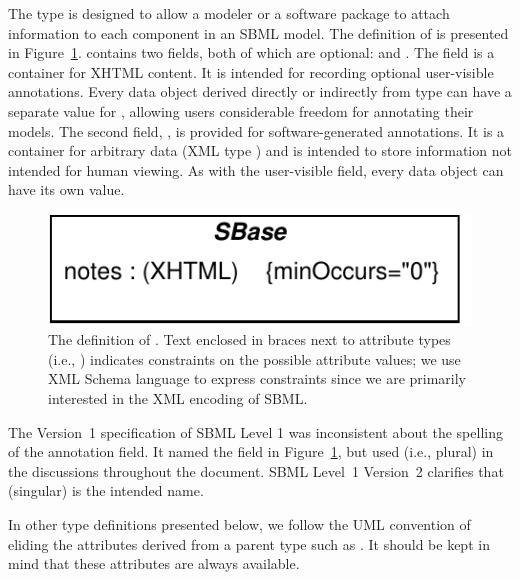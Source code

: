 \documentclass[10pt]{cekarticle}
\newcommand{\vref}[1]{\ref{#1}}
\newcommand{\changed}[1]{\textcolor{BrickRed}{#1}}
\begin{document}
The type  is designed to allow a modeler or a software package
to attach information to each component in an SBML model.  The definition
of  is presented in Figure~\vref{fig:identified}.
 contains two fields, both of which are optional:
 and \changed{}.  The field 
is a container for XHTML content.  It is intended for recording optional
user-visible annotations.  Every data object derived directly or indirectly
from type  can have a separate value for ,
allowing users considerable freedom for annotating their models.  The
second field, \changed{}, is provided for
software-generated annotations.  It is a container for arbitrary data (XML
type ) and is intended to store information not intended for
human viewing.  As with the user-visible  field, every data
object can have its own \changed{} value.

\begin{figure}[thb]
  \centering
  \includegraphics[scale = 0.68]{identified}
  \caption{The definition of .  Text enclosed in braces next
    to attribute types (i.e., ) indicates
    constraints on the possible attribute values; we use XML Schema
    language to express constraints since we are primarily interested in
    the XML encoding of SBML.}
  \label{fig:identified}
\end{figure}

\changed{The Version~1 specification of SBML Level 1 was inconsistent about
  the spelling of the annotation field.  It named the field
  \attrib{annotation} in Figure~\ref{fig:identified}, but used
  \attrib{annotations} (i.e., plural) in the discussions throughout the
  document.  SBML Level~1 Version~2 clarifies that \attrib{annotation} (singular) is the
  intended name.}

In other type definitions presented below, we follow the UML convention of
eliding the attributes derived from a parent type such as .
It should be kept in mind that these attributes are always available.
\end{document}

